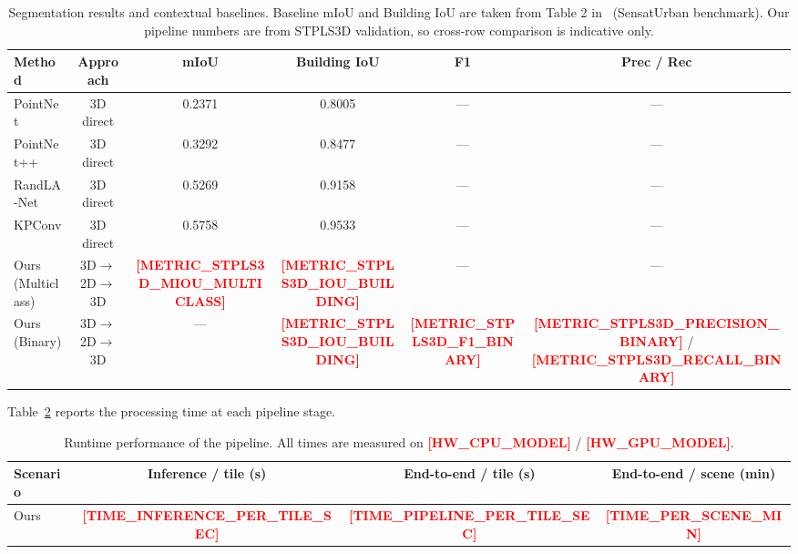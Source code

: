 \documentclass[11pt]{article}
\newcommand{\placeholder}[1]{\textcolor{red}{\textbf{[#1]}}}
\begin{document}
\begin{table}[t]
    \centering
    \caption{Segmentation results and contextual baselines. Baseline mIoU and Building IoU are taken from Table 2 in~\cite{hu2021stpls3d} (SensatUrban benchmark). Our pipeline numbers are from STPLS3D validation, so cross-row comparison is indicative only.}
    \label{tab:main_results}
    \small
    \begin{tabular}{lccccc}
        \toprule
        Method & Approach & mIoU & Building IoU & F1 & Prec / Rec \\
        \midrule
        PointNet~\cite{qi2017pointnet,hu2021stpls3d} & 3D direct & 0.2371 & 0.8005 & --- & --- \\
        PointNet++~\cite{qi2017pointnetpp,hu2021stpls3d} & 3D direct & 0.3292 & 0.8477 & --- & --- \\
        RandLA-Net~\cite{hu2021stpls3d} & 3D direct & 0.5269 & 0.9158 & --- & --- \\
        KPConv~\cite{hu2021stpls3d} & 3D direct & 0.5758 & 0.9533 & --- & --- \\
        \midrule
        Ours (Multiclass) & 3D$\rightarrow$2D$\rightarrow$3D & \placeholder{METRIC\_STPLS3D\_MIOU\_MULTICLASS} & \placeholder{METRIC\_STPLS3D\_IOU\_BUILDING} & --- & --- \\
        Ours (Binary) & 3D$\rightarrow$2D$\rightarrow$3D & --- & \placeholder{METRIC\_STPLS3D\_IOU\_BUILDING} & \placeholder{METRIC\_STPLS3D\_F1\_BINARY} & \placeholder{METRIC\_STPLS3D\_PRECISION\_BINARY} / \placeholder{METRIC\_STPLS3D\_RECALL\_BINARY} \\
        \bottomrule
    \end{tabular}
\end{table}

Table~\ref{tab:runtime} reports the processing time at each pipeline stage.

\begin{table}[t]
    \centering
    \caption{Runtime performance of the pipeline. All times are measured on \placeholder{HW\_CPU\_MODEL} / \placeholder{HW\_GPU\_MODEL}.}
    \label{tab:runtime}
    \small
    \begin{tabular}{lccc}
        \toprule
        Scenario & Inference / tile (s) & End-to-end / tile (s) & End-to-end / scene (min) \\
        \midrule
        Ours & \placeholder{TIME\_INFERENCE\_PER\_TILE\_SEC} & \placeholder{TIME\_PIPELINE\_PER\_TILE\_SEC} & \placeholder{TIME\_PER\_SCENE\_MIN} \\
        \bottomrule
    \end{tabular}
\end{table}
\end{document}
